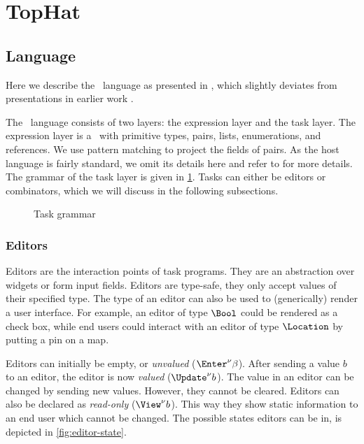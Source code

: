 
\section{TopHat}
\label{sec:tophat}


\subsection{Language}

Here we describe the \TOPHAT\ language as presented in \citet{Steenvoorden22},
which slightly deviates from presentations in earlier work \cite{conf/ppdp/SteenvoordenNK19,conf/ifl/NausSK19,conf/sfp/NausS20}.

The \TOPHAT\ language consists of two layers: the expression layer and the task layer.
The expression layer is a \STLC\ with primitive types, pairs, lists, enumerations, and references.
We use pattern matching to project the fields of pairs.
As the host language is fairly standard, we omit its details here
and refer to \citet{Steenvoorden22} for more details.
The grammar of the task layer is given in \cref{fig:task-grammar}.
Tasks can either be editors or combinators,
which we will discuss in the following subsections.

\begin{figure}
  \caption{Task grammar}
  \label{fig:task-grammar}
\end{figure}

\subsubsection{Editors}

Editors are the interaction points of task programs.
They are an abstraction over widgets or form input fields.
Editors are type-safe,
they only accept values of their specified type.
The type of an editor can also be used to (generically) render a user interface.
For example,
an editor of type $\Bool$ could be rendered as a check box,
while end users could interact with an editor of type $\Location$ by putting a pin on a map.

Editors can initially be empty, or \emph{unvalued} ($\Enter^\nu \beta$).
After sending a value $b$ to an editor, the editor is now \emph{valued} ($\Update^\nu b$).
The value in an editor can be changed by sending new values.
However, they cannot be cleared.
Editors can also be declared as \emph{read-only} ($\View^\nu b$).
This way they show static information to an end user which cannot be changed.
The possible states editors can be in, is depicted in \cref{fig:editor-state}.

